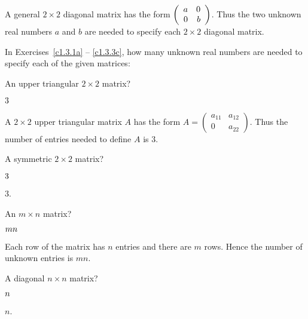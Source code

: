 \documentclass{ximera}
\begin{document}
\noindent A general $2\times 2$ diagonal matrix has the form
$\left(\begin{array}{rr} a & 0\\ 0 &b\end{array}\right)$.  Thus the two unknown real numbers $a$ and $b$ are
needed to specify each $2\times 2$ diagonal matrix.  

In Exercises~\ref{c1.3.1a} -- \ref{c1.3.3c}, how many unknown real numbers
are needed to specify each of the given matrices:
\begin{exercise}  \label{c1.3.1a}
An upper triangular $2\times 2$ matrix? \begin{prompt}${3}$\end{prompt}

\begin{solution}
\soln A $2\times 2$ upper triangular matrix $A$ has the form $A = \left( \begin{array}{cc}
            a_{11} & a_{12} \\
            0 & a_{22} \end{array} \right)$.  Thus the number of entries needed to define $A$ is $3$.  

\end{solution}
\end{exercise}

\begin{exercise}  \label{c1.3.1b}
A symmetric $2\times 2$ matrix? \begin{prompt}${3}$\end{prompt}

\begin{solution}
\ans $3$.

\end{solution}
\end{exercise}

\begin{exercise}  \label{c1.3.2}
An $m\times n$ matrix? \begin{prompt}${mn}$\end{prompt}

\begin{solution}
\ans Each row of the matrix has $n$ entries and there are $m$ rows.  Hence the number of unknown entries is $mn$.

\end{solution}
\end{exercise}

\begin{exercise}  \label{c1.3.3a}
A diagonal $n\times n$ matrix? \begin{prompt}${n}$\end{prompt}

\begin{solution}
\ans $n$.

\end{solution}
\end{exercise}
\end{document}
